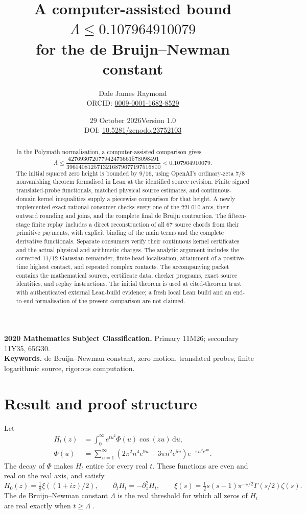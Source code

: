 \documentclass[11pt,a4paper]{article}
\title{A computer-assisted bound\\
 $\Lambda\le 0.107964910079$\\
 for the de Bruijn--Newman constant}
\author{Dale James Raymond\\[3pt]
 \small ORCID: \href{https://orcid.org/0009-0001-1682-8529}{0009-0001-1682-8529}}
\date{29 October 2026\quad\textbar\quad Version 1.0\\[3pt]
\small DOI: \href{https://doi.org/10.5281/zenodo.23752103}{10.5281/zenodo.23752103}}
\theoremstyle{definition}
\theoremstyle{remark}
\newcommand{\dd}{\mathrm d}
\begin{document}
\maketitle
\begin{abstract}
In the Polymath normalisation, a computer-assisted comparison gives
\[
 \Lambda\le
 \frac{427693072077942473661578098491}
 {3961408125713216879677197516800}
 <0.107964910079.
\]
The initial squared zero height is bounded by $9/16$, using OpenAI's
ordinary-zeta $7/8$ nonvanishing theorem formalised in Lean at the
identified source revision. Finite signed translated-probe
functionals, matched physical source estimates, and continuous-domain
kernel inequalities supply a piecewise comparison for that height.
A newly implemented exact rational consumer checks every one of the
$221\,010$ arcs, their outward rounding and joins, and the complete
final de Bruijn contraction. The fifteen-stage finite replay includes a direct reconstruction of all
$67$ source chords from their primitive payments, with explicit binding
of the main terms and the complete derivative functionals. Separate
consumers verify their continuous kernel certificates and the actual
physical and arithmetic charges. The analytic argument includes the
corrected $11/12$ Gaussian remainder, finite-head localisation,
attainment of a positive-time highest contact, and repeated complex
contacts. The accompanying packet contains the mathematical sources,
certificate data, checker programs, exact source identities, and replay
instructions. The initial theorem is used at cited-theorem trust with
authenticated external Lean-build evidence; a fresh local Lean build
and an end-to-end formalisation of the present comparison are not claimed.
\end{abstract}
\noindent\textbf{2020 Mathematics Subject Classification.}
Primary 11M26; secondary 11Y35, 65G30.\\
\textbf{Keywords.} de Bruijn--Newman constant, zero motion, translated
probes, finite logarithmic source, rigorous computation.

\clearpage
\tableofcontents
\clearpage

\section{Result and proof structure}\label{intro:result}
Let
\begin{align}
 H_t(z)&=\int_0^\infty e^{tu^2}\Phi(u)\cos(zu)\,\dd u,
 \label{intro:H}\\
 \Phi(u)&=\sum_{n=1}^{\infty}
 (2\pi^2n^4e^{9u}-3\pi n^2e^{5u})e^{-\pi n^2e^{4u}}.
 \nonumber
\end{align}
The decay of $\Phi$ makes $H_t$ entire for every real $t$. These functions
are even and real on the real axis, and satisfy
\begin{equation}\label{intro:normalisation}
 H_0(z)=\tfrac18\xi((1+iz)/2),\qquad
 \partial_t H_t=-\partial_z^2H_t,\qquad
 \xi(s)=\tfrac12s(s-1)\pi^{-s/2}\Gamma(s/2)\zeta(s).
\end{equation}
The de Bruijn--Newman constant $\Lambda$ is the real threshold for which
all zeros of $H_t$ are real exactly when $t\ge\Lambda$
\cite{deBruijn,Newman,Polymath}.
\end{document}
